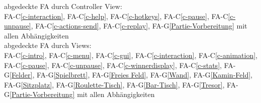 abgedeckte FA durch Controller View:\\
FA-C\ref{c-interaction}, FA-C\ref{c-help}, FA-C\ref{c-hotkeys}, FA-C\ref{c-pause}, FA-C\ref{c-unpause}, FA-C\ref{c-actions-send}, FA-C\ref{c-replay}, FA-G\ref{Partie-Vorbereitung} mit allen Abhängigkeiten\\
abgedeckte FA durch Views:\\
FA-C\ref{c-intro}, FA-C\ref{c-menu}, FA-C\ref{c-gui}, FA-C\ref{c-interaction}, FA-C\ref{c-animation}, FA-C\ref{c-pause}, FA-C\ref{c-unpause}, FA-C\ref{c-winnerdisplay}, FA-C\ref{c-stats}, FA-G\ref{Felder}, FA-G\ref{Spielbrett}, FA-G\ref{Freies Feld}, FA-G\ref{Wand}, FA-G\ref{Kamin-Feld}, FA-G\ref{Sitzplatz}, FA-G\ref{Roulette-Tisch}, FA-G\ref{Bar-Tisch}, FA-G\ref{Tresor}, FA-G\ref{Partie-Vorbereitung} mit allen Abhängigkeiten\\
